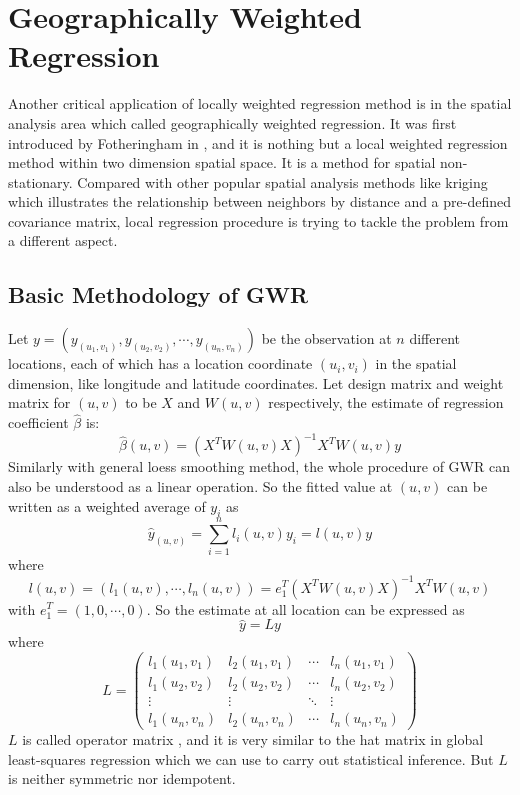 \section{Geographically Weighted Regression}

Another critical application of locally weighted regression method is in the 
spatial analysis area which called geographically weighted regression. It was first
introduced by Fotheringham in \cite{fotheringhamgeographically}, and it is nothing
but a local weighted regression method within two dimension spatial space. It is
a method for spatial non-stationary. Compared with other popular spatial analysis
methods like kriging \cite{krige1951statistical} which illustrates the relationship 
between neighbors by distance and a pre-defined covariance matrix, local regression 
procedure is trying to tackle the problem from a different aspect.

\subsection{Basic Methodology of GWR}

Let $y=(y_{(u_1,v_1)}, y_{(u_2,v_2)}, \cdots, y_{(u_n,v_n)})$ be the observation 
at $n$ different locations, each of which has a location coordinate $(u_i, v_i)$ 
in the spatial dimension, like longitude and latitude coordinates. Let design matrix 
and weight matrix for $(u, v)$ to be $X$ and $W(u, v)$ respectively, the estimate 
of regression coefficient $\hat \beta$ is:
\begin{equation}
\hat \beta(u, v) = (X^TW(u,v)X)^{-1}X^TW(u,v)y
\end{equation}
Similarly with general loess smoothing method, the whole procedure of GWR can
also be understood as a linear operation. So the fitted value at $(u, v)$ can 
be written as a weighted average of $y_i$ as
\begin{equation}
\hat y_{(u,v)} = \sum_{i=1}^n l_i(u,v)y_i = l(u,v)y
\end{equation}
where
\begin{equation}
l(u,v) = (l_1(u,v), \cdots, l_n(u,v)) = e_1^T(X^TW(u,v)X)^{-1}X^TW(u,v)
\end{equation}
with $e_1^T = (1,0,\cdots,0)$. So the estimate at all location can be expressed
as
\begin{equation}
\hat y = Ly
\end{equation}
where 
\begin{equation}
L =  
\begin{pmatrix}
  l_1(u_1,v_1) & l_2(u_1,v_1) & \cdots & l_n(u_1,v_1) \\
  l_1(u_2,v_2) & l_2(u_2,v_2) & \cdots & l_n(u_2,v_2) \\
  \vdots  & \vdots & \ddots & \vdots  \\
  l_1(u_n,v_n) & l_2(u_n,v_n) & \cdots & l_n(u_n,v_n) 
\end{pmatrix}
\end{equation}
$L$ is called operator matrix \cite{hafen2010local}, and it is very similar to the
hat matrix in global least-squares regression which we can use to carry out 
statistical inference. But $L$ is neither symmetric nor idempotent.

